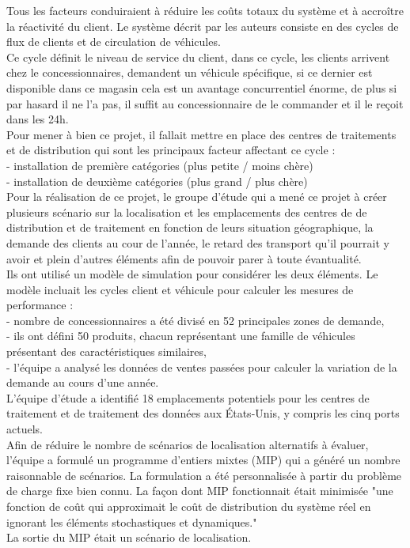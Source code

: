 \documentclass{ceri}
\begin{document}
Tous les facteurs conduiraient à réduire les coûts totaux du système et à accroître la réactivité du client. Le système décrit par les auteurs consiste en des cycles de flux de clients et de circulation de véhicules.\\
Ce cycle définit le niveau de service du client, dans ce cycle, les clients arrivent chez le concessionnaires, demandent un véhicule spécifique, si ce dernier est disponible dans ce magasin cela est un avantage concurrentiel énorme, de plus si par hasard il ne l'a pas, il suffit au concessionnaire de le commander et il le reçoit dans les 24h.\\


Pour mener à bien ce projet, il fallait mettre en place des centres de traitements et de distribution qui sont les principaux facteur affectant ce cycle :\\
- installation de première catégories (plus petite / moins chère)\\
- installation de deuxième catégories (plus grand / plus chère)\\


Pour la réalisation de ce projet, le groupe d'étude qui a mené ce projet à créer plusieurs scénario sur la localisation et les emplacements des centres de de distribution et de traitement en fonction de leurs situation géographique, la demande des clients au cour de l'année, le retard des transport qu'il pourrait y avoir et plein d'autres éléments afin de pouvoir parer à toute évantualité.\\
Ils ont utilisé un modèle de simulation pour considérer les deux éléments. Le modèle incluait les cycles client et véhicule pour calculer les mesures de performance :\\
- nombre de concessionnaires a été divisé en 52 principales zones de demande,\\
- ils ont défini 50 produits, chacun représentant une famille de véhicules présentant des caractéristiques similaires,\\
- l'équipe a analysé les données de ventes passées pour calculer la variation de la demande au cours d'une année.\\



L'équipe d'étude a identifié 18 emplacements potentiels pour les centres de traitement et de traitement des données aux États-Unis, y compris les cinq ports actuels.\\

Afin de réduire le nombre de scénarios de localisation alternatifs à évaluer, l'équipe a formulé un programme d'entiers mixtes (MIP) qui a généré un nombre raisonnable de scénarios.
La formulation a été personnalisée à partir du problème de charge fixe bien connu. La façon dont MIP fonctionnait était minimisée "une fonction de coût qui approximait le coût de distribution du système réel en ignorant les éléments stochastiques et dynamiques." \\
La sortie du MIP était un scénario de localisation.\\
\end{document}
